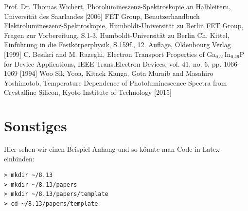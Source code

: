 \documentclass[aps,twocolumn,secnumarabic,nobalancelastpage,amsmath,amssymb,
nofootinbib,superscriptaddress]{revtex4-1}
\begin{document}


\begin{thebibliography}{99}
Prof. Dr. Thomas Wichert, Photolumineszenz-Spektroskopie an Halbleitern, Universität des Saarlandes [2006]
FET Group, Benutzerhandbuch Elektrolumineszenz-Spektroskopie, Humboldt-Universität zu Berlin
FET Group, Fragen zur Vorbereitung, S.1-3, Humboldt-Universität zu Berlin
Ch. Kittel, Einführung in die Festkörperphysik, S.159f., 12. Auflage, Oldenbourg Verlag [1999]
C. Besikci and M. Razeghi, Electron Transport Properties of Ga$_{0.51}$In$_{0.49}$P for Device Applications, IEEE Trans.Electron Devices, vol. 41, no. 6, pp. 1066-1069 [1994]
Woo Sik Yooa, Kitaek Kanga, Gota Muraib and Masahiro Yoshimotob, Temperature Dependence of Photoluminescence Spectra from Crystalline Silicon, Kyoto Institute of Technology [2015]
\end{thebibliography}


\clearpage
\appendix

\section{Sonstiges}
Hier sehen wir einen Beispiel Anhang und so könnte man Code in Latex einbinden:
\begin{verbatim}
> mkdir ~/8.13
> mkdir ~/8.13/papers
> mkdir ~/8.13/papers/template
> cd ~/8.13/papers/template
\end{verbatim}


\end{document}
